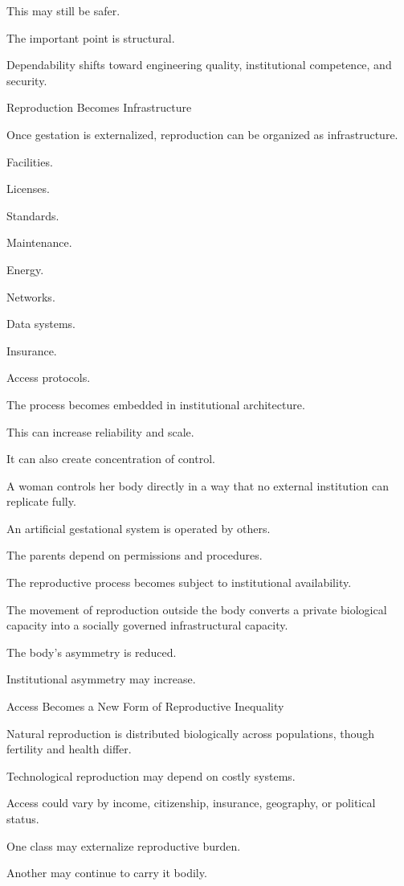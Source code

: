 This may still be safer.

The important point is structural.

Dependability shifts toward engineering quality, institutional competence, and security.

Reproduction Becomes Infrastructure

Once gestation is externalized, reproduction can be organized as infrastructure.

Facilities.

Licenses.

Standards.

Maintenance.

Energy.

Networks.

Data systems.

Insurance.

Access protocols.

The process becomes embedded in institutional architecture.

This can increase reliability and scale.

It can also create concentration of control.

A woman controls her body directly in a way that no external institution can replicate fully.

An artificial gestational system is operated by others.

The parents depend on permissions and procedures.

The reproductive process becomes subject to institutional availability.

The movement of reproduction outside the body converts a private biological capacity into a socially governed infrastructural capacity.

The body’s asymmetry is reduced.

Institutional asymmetry may increase.

Access Becomes a New Form of Reproductive Inequality

Natural reproduction is distributed biologically across populations, though fertility and health differ.

Technological reproduction may depend on costly systems.

Access could vary by income, citizenship, insurance, geography, or political status.

One class may externalize reproductive burden.

Another may continue to carry it bodily.

